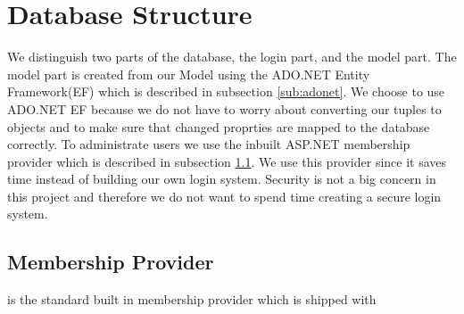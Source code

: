 \section{Database Structure}
\label{sec:databasestructure}

We distinguish two parts of the database, the login part, and the model part. 
The model part is created from our Model  using the ADO.NET Entity Framework(EF) which is described in subsection \ref{sub:adonet}. We choose to use ADO.NET EF because we do not have to worry about converting our tuples to objects and to make sure that changed proprties are mapped to the database correctly.  
To administrate users we use the inbuilt ASP.NET membership provider which is described in subsection \ref{sub:membershipprovider}. 
We use this provider since it saves time instead of building our own login system. 
Security is not a big concern in this project and therefore we do not want to spend time creating a secure login system. 




\subsection{Membership Provider}
\label{sub:membershipprovider}
is the standard built in membership provider which is shipped with 